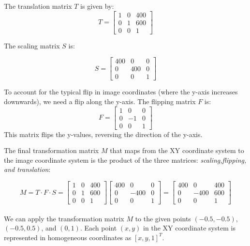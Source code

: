 \documentclass[12pt]{report}
\begin{document}
\begin{enumerate}
    The translation matrix \(T\) is given by:
    $$
    T =
    \begin{bmatrix}
    1 & 0 & 400 \\
    0 & 1 & 600 \\
    0 & 0 & 1
    \end{bmatrix}
    $$
    
    The scaling matrix \(S\) is:

    $$
    S =
    \begin{bmatrix}
    400 & 0 & 0 \\
    0 & 400 & 0 \\
    0 & 0 & 1
    \end{bmatrix}
    $$

    To account for the typical flip in image coordinates (where the y-axis increases downwards), we need a flip along the y-axis. The flipping matrix \(F\) is:
    $$
    F =
    \begin{bmatrix}
    1 & 0 & 0 \\
    0 & -1 & 0 \\
    0 & 0 & 1
    \end{bmatrix}
    $$
    This matrix flips the y-values, reversing the direction of the y-axis.  

    The final transformation matrix \(M\) that maps from the XY coordinate system to the image coordinate system is the product of 
    the three matrices: \textit{scaling,flipping, and translation}:

    $$
    M = T \cdot F \cdot S = 
    \begin{bmatrix}
    1 & 0 & 400 \\
    0 & 1 & 600 \\
    0 & 0 & 1
    \end{bmatrix}
    \begin{bmatrix}
    400 & 0 & 0 \\
    0 & -400 & 0 \\
    0 & 0 & 1
    \end{bmatrix}
    =
    \begin{bmatrix}
    400 & 0 & 400 \\
    0 & -400 & 600 \\
    0 & 0 & 1
    \end{bmatrix}
    $$ \\

    
    We can apply the transformation matrix \(M\) to the given points \((-0.5, -0.5)\), \((-0.5, 0.5)\), and \((0,1)\). Each point \((x, y)\) 
    in the XY coordinate system is represented in homogeneous coordinates as \([x, y, 1]^T\).


\end{enumerate}
\end{document}
